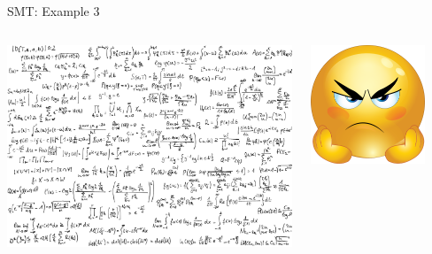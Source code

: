 \documentclass[10pt, compress]{beamer}
\begin{document}
\begin{frame}{SMT: Example 3}

	\begin{columns}
		\begin{column}{0.7\textwidth}
			\includegraphics[width=\textwidth]{images/equations.jpg}
		\end{column}
		\begin{column}{0.3\textwidth}
			\includegraphics[width=0.8\textwidth]{images/angry.png}
		\end{column}
	\end{columns}  
	
\end{frame}
\end{document}
